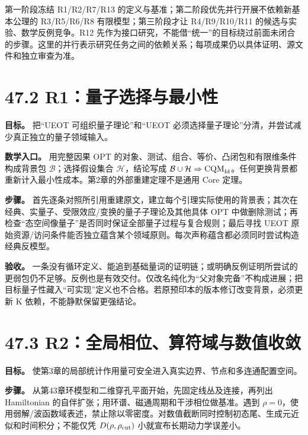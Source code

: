 \documentclass[
  11pt,
  oneside]{book}
\begin{document}
第一阶段冻结 R1/R2/R7/R13
的定义与基准；第二阶段优先并行开展不依赖新基本公理的 R3/R5/R6/R8
有限模型；第三阶段才让 R4/R9/R10/R11 的候选与实验、数学反例竞争。R12
先作为接口研究，不能借``统一''的目标绕过前面未闭合的步骤。这里的并行表示研究任务之间的依赖关系；每项成果仍以具体证明、源文件和独立审查为准。

\hypertarget{r1ux91cfux5b50ux9009ux62e9ux4e0eux6700ux5c0fux6027}{%
\section{47.2
R1：量子选择与最小性}\label{r1ux91cfux5b50ux9009ux62e9ux4e0eux6700ux5c0fux6027}}

\textbf{目标。} 把``UEOT 可组织量子理论''和``UEOT
必须选择量子理论''分清，并尝试减少真正独立的量子领域输入。

\textbf{数学入口。} 用完整因果 OPT
的对象、测试、组合、等价、凸闭包和有限维条件构成背景包
\(\mathcal B\)；选择假设集合 \(\mathcal H\)，结论写成
\(\mathcal B\cup\mathcal H\Rightarrow\mathrm{CQM}_{\rm fd}\)。任何更换背景都重新计入最小性成本。第2章的外部重建定理不是通用
Core 定理。

\textbf{步骤。}
首先逐条对照所引用重建原文，建立每个引理实际使用的背景表；其次在经典、实量子、受限效应/变换的量子子理论及其他具体
OPT
中做删除测试；再检查``态空间像量子''是否同时保证全部量子过程与复合规则；最后寻找
UEOT
原始资源/访问条件能否独立蕴含某个领域原则。每次声称蕴含都必须同时尝试构造经典反模型。

\textbf{验收。}
一条没有循环定义、能追到基础量词的证明链；或明确反例证明所尝试的更弱包仍不足够。反例也是有效交付。仅改名纯化为``父对象完备''不构成进展；把目标量子性藏入``可实现''定义也不合格。若原预印本的版本修订改变背景，必须更新
K 依赖，不能静默保留更强结论。

\hypertarget{r2ux5168ux5c40ux76f8ux4f4dux7b97ux7b26ux57dfux4e0eux6570ux503cux6536ux655b}{%
\section{47.3
R2：全局相位、算符域与数值收敛}\label{r2ux5168ux5c40ux76f8ux4f4dux7b97ux7b26ux57dfux4e0eux6570ux503cux6536ux655b}}

\textbf{目标。}
使第3章的局部统计作用量可安全进入真实边界、节点和多连通配置空间。

\textbf{步骤。}
从第43章环模型和二维穿孔平面开始，先固定线丛及连接，再列出 Hamiltonian
的自伴扩张；用环谱、磁通周期和干涉相位做基准。遇到
\(\rho=0\)，使用弱解/波函数域表述，禁止除以零密度。对数值截断同时控制初态尾、生成元近似和时间积分；不能仅凭
\(D(\rho,\rho_{\rm cut})\) 小就宣布长期动力学误差小。
\end{document}
